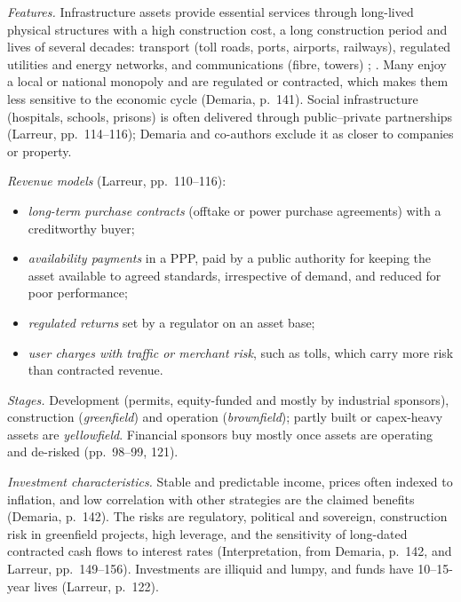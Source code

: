 \begin{qfdefinition}\label{def:infrastructure-characteristics}
 \emph{Features.} Infrastructure assets provide essential services through long-lived physical structures with a high construction cost, a long construction period and lives of several decades: transport (toll roads, ports, airports, railways), regulated utilities and energy networks, and communications (fibre, towers) \citep[p.~97]{larreur-structured-finance-2021}; \citep[pp.~141--142]{demaria-private-markets-2021}. Many enjoy a local or national monopoly and are regulated or contracted, which makes them less sensitive to the economic cycle (Demaria, p.~141). Social infrastructure (hospitals, schools, prisons) is often delivered through public--private partnerships (Larreur, pp.~114--116); Demaria and co-authors exclude it as closer to companies or property.

\emph{Revenue models} (Larreur, pp.~110--116):
\begin{itemize}
\item \emph{long-term purchase contracts} (offtake or power purchase agreements) with a creditworthy buyer;
\item \emph{availability payments} in a PPP, paid by a public authority for keeping the asset available to agreed standards, irrespective of demand, and reduced for poor performance;
\item \emph{regulated returns} set by a regulator on an asset base;
\item \emph{user charges with traffic or merchant risk}, such as tolls, which carry more risk than contracted revenue.
\end{itemize}

\emph{Stages.} Development (permits, equity-funded and mostly by industrial sponsors), construction (\emph{greenfield}) and operation (\emph{brownfield}); partly built or capex-heavy assets are \emph{yellowfield}. Financial sponsors buy mostly once assets are operating and de-risked (pp.~98--99, 121).

\emph{Investment characteristics.} Stable and predictable income, prices often indexed to inflation, and low correlation with other strategies are the claimed benefits (Demaria, p.~142). The risks are regulatory, political and sovereign, construction risk in greenfield projects, high leverage, and the sensitivity of long-dated contracted cash flows to interest rates (Interpretation, from Demaria, p.~142, and Larreur, pp.~149--156). Investments are illiquid and lumpy, and funds have 10--15-year lives (Larreur, p.~122).


\end{qfdefinition}
